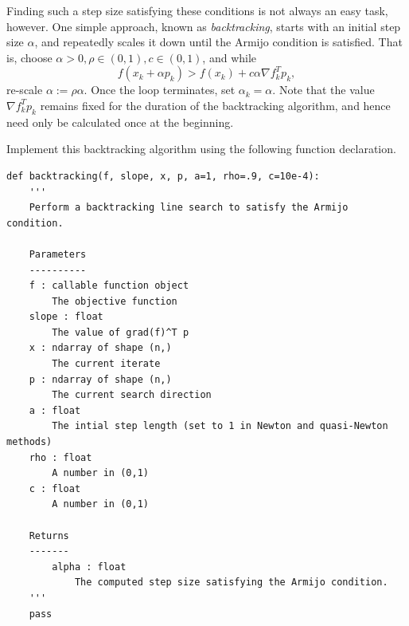 Finding such a step size satisfying these conditions is not always an easy task, however.
One simple approach, known as \emph{backtracking}, starts with an initial step size
$\alpha$, and repeatedly scales it down until the Armijo condition is satisfied.
That is, choose $\alpha >0, \rho \in (0, 1), c\in (0, 1)$, and while
$$
f(x_k + \alpha p_k) > f(x_k) + c\alpha\nabla f_k^Tp_k,
$$
re-scale $\alpha := \rho\alpha$. Once the loop terminates, set $\alpha_k = \alpha$. Note that the value
$\nabla f_k^Tp_k$ remains fixed for the duration of the backtracking algorithm, and hence need only
be calculated once at the beginning.
%

\begin{problem}
Implement this backtracking algorithm using the following function declaration. 
\begin{lstlisting}
def backtracking(f, slope, x, p, a=1, rho=.9, c=10e-4):
    '''
    Perform a backtracking line search to satisfy the Armijo condition.
    
    Parameters
    ----------
    f : callable function object
        The objective function
    slope : float 
        The value of grad(f)^T p
    x : ndarray of shape (n,) 
        The current iterate
    p : ndarray of shape (n,) 
        The current search direction
    a : float 
        The intial step length (set to 1 in Newton and quasi-Newton methods)
    rho : float 
        A number in (0,1)
    c : float 
        A number in (0,1)
    
    Returns
    -------
        alpha : float
            The computed step size satisfying the Armijo condition.
    '''
    pass
\end{lstlisting}
\end{problem}

